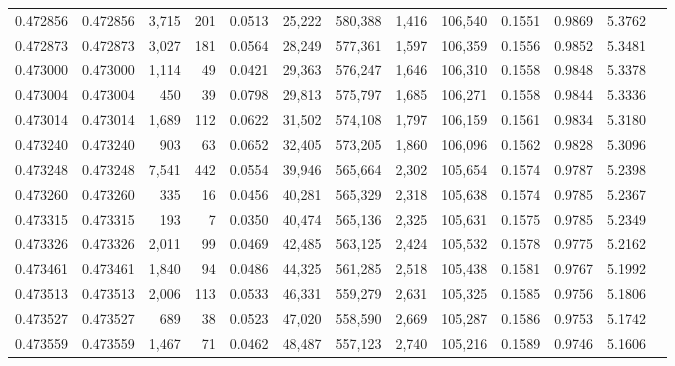 \begin{tabular}{rrrrrrrrrrrrr}
0.472856 & 0.472856 & 3,715 &   201 &                                     0.0513 &  25,222 & 580,388 &   1,416 & 106,540 & 0.1551 & 0.9869 & 5.3762 \\
0.472873 & 0.472873 & 3,027 &   181 &                                     0.0564 &  28,249 & 577,361 &   1,597 & 106,359 & 0.1556 & 0.9852 & 5.3481 \\
0.473000 & 0.473000 & 1,114 &    49 &                                     0.0421 &  29,363 & 576,247 &   1,646 & 106,310 & 0.1558 & 0.9848 & 5.3378 \\
0.473004 & 0.473004 &   450 &    39 &                                     0.0798 &  29,813 & 575,797 &   1,685 & 106,271 & 0.1558 & 0.9844 & 5.3336 \\
0.473014 & 0.473014 & 1,689 &   112 &                                     0.0622 &  31,502 & 574,108 &   1,797 & 106,159 & 0.1561 & 0.9834 & 5.3180 \\
0.473240 & 0.473240 &   903 &    63 &                                     0.0652 &  32,405 & 573,205 &   1,860 & 106,096 & 0.1562 & 0.9828 & 5.3096 \\
0.473248 & 0.473248 & 7,541 &   442 &                                     0.0554 &  39,946 & 565,664 &   2,302 & 105,654 & 0.1574 & 0.9787 & 5.2398 \\
0.473260 & 0.473260 &   335 &    16 &                                     0.0456 &  40,281 & 565,329 &   2,318 & 105,638 & 0.1574 & 0.9785 & 5.2367 \\
0.473315 & 0.473315 &   193 &     7 &                                     0.0350 &  40,474 & 565,136 &   2,325 & 105,631 & 0.1575 & 0.9785 & 5.2349 \\
0.473326 & 0.473326 & 2,011 &    99 &                                     0.0469 &  42,485 & 563,125 &   2,424 & 105,532 & 0.1578 & 0.9775 & 5.2162 \\
0.473461 & 0.473461 & 1,840 &    94 &                                     0.0486 &  44,325 & 561,285 &   2,518 & 105,438 & 0.1581 & 0.9767 & 5.1992 \\
0.473513 & 0.473513 & 2,006 &   113 &                                     0.0533 &  46,331 & 559,279 &   2,631 & 105,325 & 0.1585 & 0.9756 & 5.1806 \\
0.473527 & 0.473527 &   689 &    38 &                                     0.0523 &  47,020 & 558,590 &   2,669 & 105,287 & 0.1586 & 0.9753 & 5.1742 \\
0.473559 & 0.473559 & 1,467 &    71 &                                     0.0462 &  48,487 & 557,123 &   2,740 & 105,216 & 0.1589 & 0.9746 & 5.1606 \\

\end{tabular}
